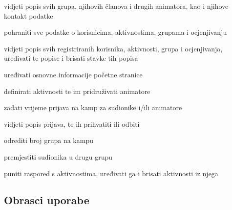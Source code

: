 \begin{packed_enum}
\begin{packed_enum}
				\end{packed_enum}
					\item  {}
				\begin{packed_enum}
					
					\item vidjeti popis svih grupa, njihovih članova i drugih animatora, kao i njihove kontakt podatke
				
				\end{packed_enum}
					\item  {}
				\begin{packed_enum}
					
					\item pohraniti sve podatke o korisnicima, aktivnostima, grupama i ocjenjivanju
					
				\end{packed_enum}
	
		    		\item  {}
		    	\begin{packed_enum}
		    		
		    		\item vidjeti popis svih registriranih korisnika, aktivnosti, grupa i ocjenjivanja, uređivati te popise i brisati stavke tih popisa
		    		\item uređivati osnovne informacije početne stranice
		    		\item definirati aktivnosti te im pridruživati animatore
		    		\item zadati vrijeme prijava na kamp za sudionike i/ili animatore
		    		\item vidjeti popis prijava, te ih prihvatiti ili odbiti
		    		\item odrediti broj grupa na kampu
		    		\item premjestiti sudionika u drugu grupu
		    		\item  puniti raspored s aktivnostima, uređivati ga i brisati aktivnosti iz njega
		    		
		    	\end{packed_enum}
			
			\end{packed_enum}
			
			\eject 
			
			
				
			\subsection{Obrasci uporabe}
				
